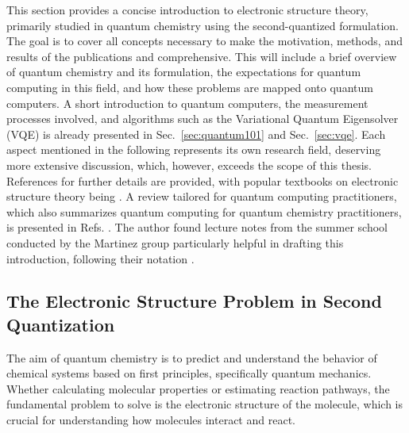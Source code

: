 \documentclass[../main.tex]{subfiles}
\begin{document}
This section provides a concise introduction to electronic structure theory, primarily studied in quantum chemistry using the second-quantized formulation. The goal is to cover all concepts necessary to make the motivation, methods, and results of the publications \cite{amsler2023classical} and \cite{kiser2024classical} comprehensive. This will include a brief overview of quantum chemistry and its formulation, the expectations for quantum computing in this field, and how these problems are mapped onto quantum computers. A short introduction to quantum computers, the measurement processes involved, and algorithms such as the Variational Quantum Eigensolver (VQE) is already presented in Sec.~\ref{sec:quantum101} and Sec.~\ref{sec:vqe}. Each aspect mentioned in the following represents its own research field, deserving more extensive discussion, which, however, exceeds the scope of this thesis. References for further details are provided, with popular textbooks on electronic structure theory being \cite{helgaker2014molecular, szabo2012modern}. A review tailored for quantum computing practitioners, which also summarizes quantum computing for quantum chemistry practitioners, is presented in Refs. \cite{mcardle2020quantum, cao2019quantum}. The author found lecture notes from the summer school conducted by the Martinez group particularly helpful in drafting this introduction, following their notation \cite{robnote12018, robnote22018, robnote32018}.

\subsection{The Electronic Structure Problem in Second Quantization}

The aim of quantum chemistry is to predict and understand the behavior of chemical systems based on first principles, specifically quantum mechanics. Whether calculating molecular properties or estimating reaction pathways, the fundamental problem to solve is the electronic structure of the molecule, which is crucial for understanding how molecules interact and react.
\end{document}
